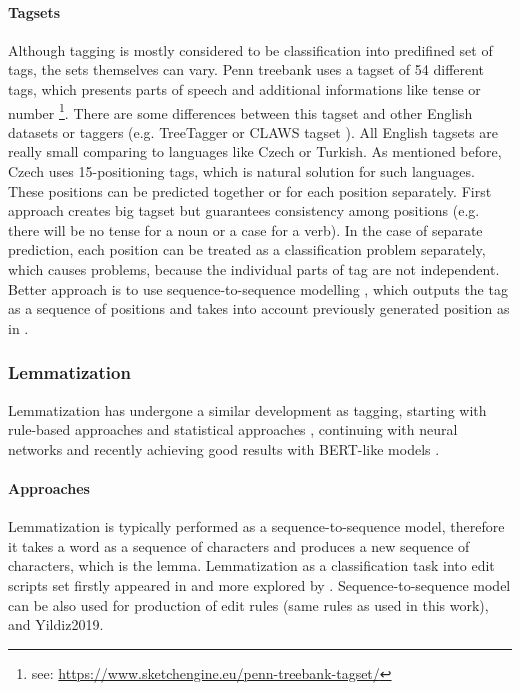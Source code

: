 \paragraph{Tagsets}
Although tagging is mostly considered to be classification into predifined set of tags, the sets themselves can vary. Penn treebank uses a tagset of 54 different tags, which presents parts of speech and additional informations like tense or number \footnote{see: \url{https://www.sketchengine.eu/penn-treebank-tagset/}}. There are some differences between this tagset and other English datasets or taggers (e.g. TreeTagger \citep{Schmid95improvementsin} or CLAWS tagset \citep{Chapelle1988TheCA}). All English tagsets are really small comparing to languages like Czech or Turkish. As mentioned before, Czech uses 15-positioning tags, which is  natural solution for such languages. These positions can be predicted together or for each position separately. First approach creates big tagset but guarantees consistency among positions (e.g. there will be no tense for a noun or a case for a verb). In the case of separate prediction, each position can be treated as a classification problem separately, which causes problems, because the individual parts of tag are not independent. Better approach is to use sequence-to-sequence modelling \citep{Sutskever2014}, which outputs the tag as a sequence of positions and takes into account previously generated position as in \citep{malaviya-etal-2019-simple}. 

\subsubsection{Lemmatization}
Lemmatization has undergone a similar development as tagging, starting with rule-based approaches and statistical approaches \citep{Plisson}, continuing with neural networks and recently achieving good results with BERT-like models \citep{Kondratyuk2019}. 

\paragraph{Approaches}
Lemmatization is typically performed as a sequence-to-sequence model, therefore it takes a word as a sequence of characters and produces a new sequence of characters, which is the lemma.  %
Lemmatization as a classification task into edit scripts set firstly appeared in \citep{Chrupala} and more explored by \citep{2018}. Sequence-to-sequence model can be also used for production of edit rules (same rules as used in this work)\citep{chakrabarty2017context}, \citep{muller2015joint} and Yildiz2019.

